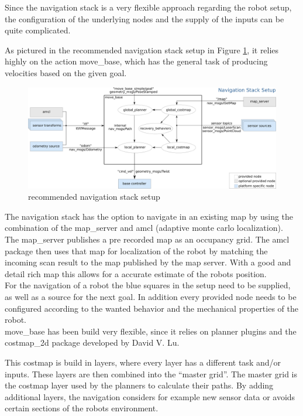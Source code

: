 Since the navigation stack is a very flexible approach regarding the robot setup, the configuration of the underlying nodes and the supply of the inputs can be quite complicated\cite{nav}.

As pictured in the recommended navigation stack setup in Figure \ref{navigation stack setup}, it relies highly on the action move\_base, which has the general task of producing velocities based on the given goal.

\begin{figure}[H]
	\centering
	\includegraphics[width=\textwidth]{Pictures/navigation stack setup}
	\caption{recommended navigation stack setup\cite{movebase}}
	
	\label{navigation stack setup}
\end{figure}

The navigation stack has the option to navigate in an existing map by using the combination of the map\_server and amcl (adaptive monte carlo localization). The map\_server publishes a pre recorded map as an occupancy grid. The amcl package then uses that map for localization of the robot by matching the incoming scan result to the map published by the map server. With a good and detail rich map this allows for a accurate estimate of the robots position.\\

For the navigation of a robot the blue squares in the setup need to be supplied, as well as a source for the next goal. In addition every provided node needs to be configured according to the wanted behavior and the mechanical properties of the robot.\\

move\_base has been build very flexible, since it relies on planner plugins and the costmap\_2d package developed by David V. Lu.

This costmap is build in layers, where every layer has a different task and/or inputs. These layers are then combined into the ``master grid''. The master grid is the costmap layer used by the planners to calculate their paths\cite{costmappaper}. By adding additional layers, the navigation considers for example new sensor data or avoids certain sections of the robots environment.

